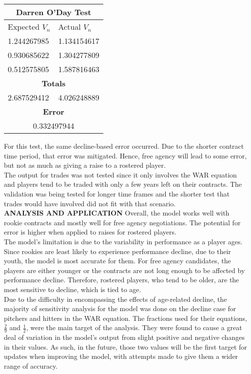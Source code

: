 \documentclass[12pt]{article}
\begin{document}
\begin{center}
\begin{tabular}{ |p{2.5cm}||p{2cm}|  }
\multicolumn{2}{|c|}{Darren O'Day Test} \\
\hline
Expected $V_n$ & Actual $V_n$ \\
\hline
 1.244267985 & 1.134154617   \\
\hline
0.930685622 & 1.304277809  \\
\hline
0.512575805  & 1.587816463  \\
 \hline
 \multicolumn{2}{|c|}{\textbf{Totals}} \\
 \hline
 2.687529412 & 4.026248889 \\
 \hline
 \multicolumn{2}{|c|}{\textbf{Error}} \\
 \hline
  \multicolumn{2}{|c|}{0.332497944} \\
 \hline
 \end{tabular}
\end{center}
For this test, the same decline-based error occurred.  Due to the shorter contract time period, that error was mitigated.  Hence, free agency will lead to some error, but not as much as giving a raise to a rostered player. \\

The output for trades was not tested since it only involves the WAR equation and players tend to be traded with only a few years left on their contracts.  The validation was being tested for longer time frames and the shorter test that trades would have involved did not fit with that scenario.  \\
\vskip 2pt
\textbf{ANALYSIS AND APPLICATION}
\vskip 2pt
Overall, the model works well with rookie contracts and mostly well for free agency negotiations.  The potential for error is higher when applied to raises for rostered players.  \\

The model's limitation is due to the variability in performance as a player ages.  Since rookies are least likely to experience performance decline, due to their youth, the model is most accurate for them.  For free agency candidates, the players are either younger or the contracts are not long enough to be affected by performance decline.  Therefore, rostered players, who tend to be older, are the most sensitive to decline, which is tied to age. \\

Due to the difficulty in encompassing the effects of age-related decline, the majority of sensitivity analysis for the model was done on the decline case for pitchers and hitters in the WAR equation. The fractions used for their equations, $\frac{2}{9}$ and $\frac{1}{2}$, were the main target of the analysis.  They were found to cause a great deal of variation in the model's output from slight positive and negative changes in their values.  As such, in the future, those two values will be the first target for updates when improving the model, with attempts made to give them a wider range of accuracy. \\
\end{document}
